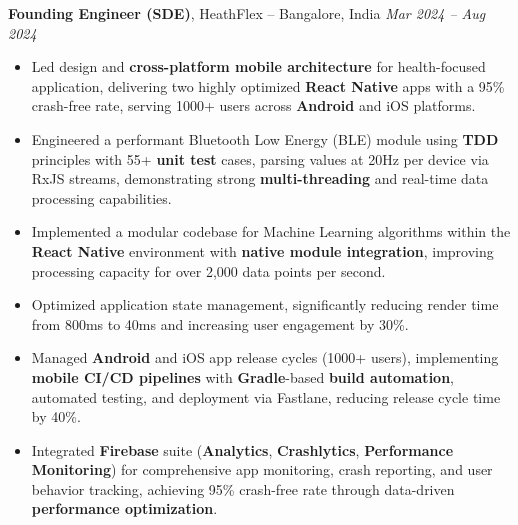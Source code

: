 \documentclass[10pt, letterpaper]{article}
\newenvironment{highlights}{
    \begin{itemize}[
        topsep=0.10 cm,
        parsep=0.10 cm,
        partopsep=0pt,
        itemsep=0.05cm, %
        leftmargin=10pt, %
        labelwidth=!, %
        labelsep=5pt %
    ]\justifying %
}{
    \end{itemize}
}
\newenvironment{onecolentry}{
    \begin{adjustwidth}{0cm}{0cm} %
    \RaggedRight %
}{
    \end{adjustwidth}
}
\begin{document}
    \vspace{0.2 cm}

    \begin{onecolentry}
        \textbf{Founding Engineer (SDE)}, HeathFlex -- Bangalore, India \hfill \textit{Mar 2024 – Aug 2024}
        \vspace{0.10 cm}
        \begin{highlights}
            \item Led design and \textbf{cross-platform mobile architecture} for health-focused application, delivering two highly optimized \textbf{React Native} apps with a 95\% crash-free rate, serving 1000+ users across \textbf{Android} and iOS platforms. %
            \item Engineered a performant Bluetooth Low Energy (BLE) module using \textbf{TDD} principles with 55+ \textbf{unit test} cases, parsing values at 20Hz per device via RxJS streams, demonstrating strong \textbf{multi-threading} and real-time data processing capabilities. %
            \item Implemented a modular codebase for Machine Learning algorithms within the \textbf{React Native} environment with \textbf{native module integration}, improving processing capacity for over 2,000 data points per second.
            \item Optimized application state management, significantly reducing render time from 800ms to 40ms and increasing user engagement by 30\%. %
            \item Managed \textbf{Android} and iOS app release cycles (1000+ users), implementing \textbf{mobile CI/CD pipelines} with \textbf{Gradle}-based \textbf{build automation}, automated testing, and deployment via Fastlane, reducing release cycle time by 40\%.
            \item Integrated \textbf{Firebase} suite (\textbf{Analytics}, \textbf{Crashlytics}, \textbf{Performance Monitoring}) for comprehensive app monitoring, crash reporting, and user behavior tracking, achieving 95\% crash-free rate through data-driven \textbf{performance optimization}.
        \end{highlights}
    \end{onecolentry}
    \vspace{0.2 cm}
\end{document}

